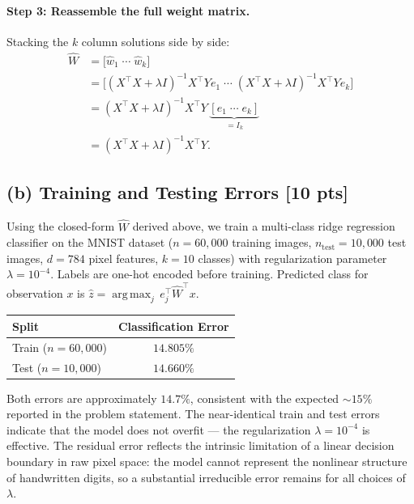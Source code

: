 \documentclass{article}
\DeclareMathOperator*{\argmax}{arg\,max}
\begin{document}
\paragraph{Step 3: Reassemble the full weight matrix.}
Stacking the $k$ column solutions side by side:
\begin{align*}
  \hat{W}
  &= \bigl[\hat{w}_1 \;\cdots\; \hat{w}_k\bigr] \\
  &= \bigl[(X^\top X + \lambda I)^{-1} X^\top Y e_1
     \;\cdots\;
     (X^\top X + \lambda I)^{-1} X^\top Y e_k\bigr] \\
  &= (X^\top X + \lambda I)^{-1} X^\top Y\,
     \underbrace{[e_1 \;\cdots\; e_k]}_{= I_k} \\[4pt]
  &= \boxed{(X^\top X + \lambda I)^{-1} X^\top Y.}
\end{align*}

\subsection*{(b) Training and Testing Errors \hfill [10 pts]}

Using the closed-form $\hat{W}$ derived above, we train a multi-class ridge regression
classifier on the MNIST dataset ($n = 60{,}000$ training images,
$n_{\text{test}} = 10{,}000$ test images, $d = 784$ pixel features, $k = 10$ classes)
with regularization parameter $\lambda = 10^{-4}$.
Labels are one-hot encoded before training.
Predicted class for observation $x$ is $\hat{z} = \argmax_j\, e_j^\top \hat{W}^\top x$.

\begin{center}
\begin{tabular}{lc}
\toprule
\textbf{Split} & \textbf{Classification Error} \\
\midrule
Train ($n = 60{,}000$) & $14.805\%$ \\
Test  ($n = 10{,}000$) & $14.660\%$ \\
\bottomrule
\end{tabular}
\end{center}

Both errors are approximately $14.7\%$, consistent with the expected ${\sim}15\%$
reported in the problem statement.
The near-identical train and test errors indicate that the model does not overfit ---
the regularization $\lambda = 10^{-4}$ is effective.
The residual error reflects the intrinsic limitation of a linear decision boundary in
raw pixel space: the model cannot represent the nonlinear structure of handwritten
digits, so a substantial irreducible error remains for all choices of $\lambda$.
\end{document}
